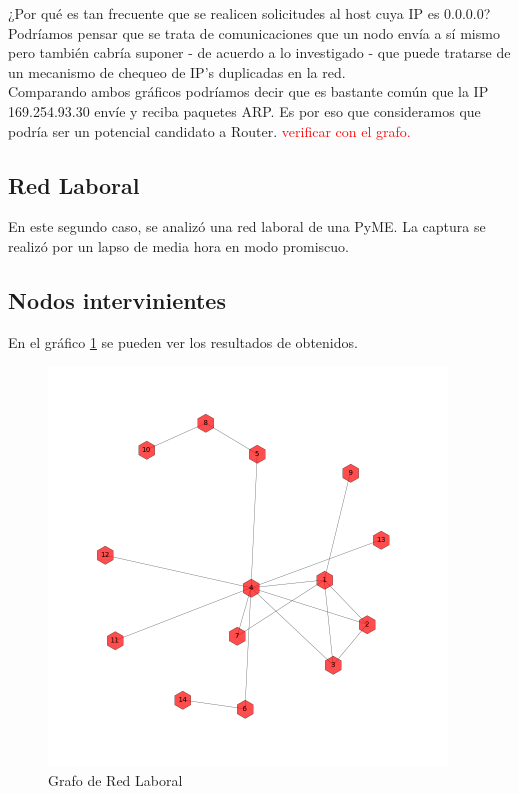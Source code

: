 ¿Por qué es tan frecuente que se realicen solicitudes al host cuya IP es 0.0.0.0? Podríamos pensar que se trata de comunicaciones que un nodo envía a sí mismo pero también cabría suponer - de acuerdo a lo investigado - que puede tratarse de un mecanismo de chequeo de IP's duplicadas en la red.\\

Comparando ambos gráficos podríamos decir que es bastante común que la IP 169.254.93.30 envíe y reciba paquetes ARP. Es por eso que consideramos que podría ser un potencial candidato a Router. \textcolor{red}{verificar con el grafo.}

\newpage
\subsection{Red Laboral}

En este segundo caso, se analizó una red laboral de una PyME. La captura se realizó por un lapso de media hora en modo promiscuo.

\subsection{Nodos intervinientes}
En el gráfico \ref{laboral:graph} se pueden ver los resultados de obtenidos.

\begin{figure}[h!]
    \centering                                                       
    \includegraphics[width=300pt]{img/laboralGraph.png}
    \caption{Grafo de Red Laboral}
    \label{laboral:graph}
\end{figure}

